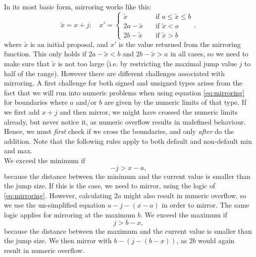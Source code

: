 \documentclass[a4paper,11pt]{article}
\begin{document}
In its most basic form, mirroring works like this:
\begin{equation}\label{eq:mirroring}
 \tilde{x} = x+j; \quad x' = \begin{cases}
                                               \tilde{x} \quad &\mbox{if } a \leq \tilde{x} \leq b \\
                                               2a-\tilde{x} \quad &\mbox{if } \tilde{x} < a\\
                                               2b-\tilde{x} \quad &\mbox{if } \tilde{x} > b
                                              \end{cases},
\end{equation}
where $\tilde{x}$ is an initial proposal, and $x'$ is the value returned from the mirroring function. This only holds if $2a-\tilde{x} < b$ and $2b-\tilde{x}>a$ in all cases, so we need to make sure that $\tilde{x}$ is not too large (i.e. by restricting the maximal jump value $j$ to half of the range). However there are different challenges associated with mirroring. A first challenge for both signed and unsigned types arises from the fact that we will run into numeric problems when using equation \eqref{eq:mirroring} for boundaries where $a$ and/or $b$ are given by the numeric limits of that type. If we first add $x+j$ and then mirror, we might have crossed the numeric limits already, but never notice it, as numeric overflow results in undefined behaviour. Hence, we must \textit{first} check if we cross the boundaries, and only \textit{after} do the addition. Note that the following rules apply to both default and non-default min and max.\\
We exceed the minimum if
\begin{equation}\label{eq:mirrorAtMin}
 -j > x - a,
\end{equation}
because the distance between the minimum and the current value is smaller than the jump size. If this is the case, we need to mirror, using the logic of \eqref{eq:mirroring}. However, calculating $2a$ might also result in numeric overflow, so we use the un-simplified equation $a - j - (x - a)$ in order to mirror.
The same logic applies for mirroring at the maximum $b$. We exceed the maximum if
\begin{equation}\label{eq:mirrorAtMax}
 j > b - x,
\end{equation}
because the distance between the maximum and the current value is smaller than the jump size. We then mirror with $b - (j - (b - x))$, as $2b$ would again result in numeric overflow.
\end{document}
